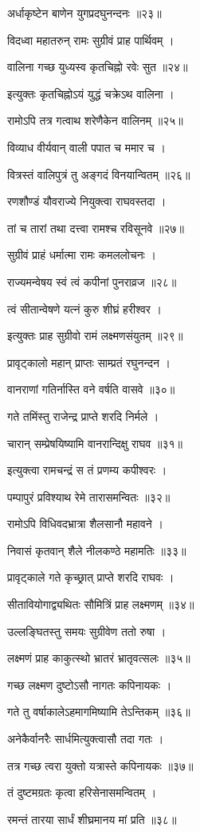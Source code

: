 अर्धाकृष्टेन बाणेन युगप्रदघुनन्दनः ॥२३॥

विदध्वा महातरुन् रामः सुग्रीवं प्राह पार्थिवम् ।

वालिना गच्छ युध्यस्व कृतचिह्नो रवेः सुत ॥२४॥

इत्युक्तः कृतचिह्नोऽयं युद्धं चक्रेऽथ वालिना ।

रामोऽपि तत्र गत्वाथ शरेणैकेन वालिनम् ॥२५॥

विव्याध वीर्यवान् वाली पपात च ममार च ।

वित्रस्तं वालिपुत्रं तु अङ्गदं विनयान्वितम् ॥२६॥

रणशौण्डं यौवराज्ये नियुक्त्वा राघवस्तदा ।

तां च तारां तथा दत्त्वा रामश्च रविसूनवे ॥२७॥

सुग्रीवं प्राहं धर्मात्मा रामः कमललोचनः ।

राज्यमन्वेषय स्वं त्वं कपीनां पुनराव्रज ॥२८॥

त्वं सीतान्वेषणे यत्नं कुरु शीघ्रं हरीश्वर ।

इत्युक्तः प्राह सुग्रीवो रामं लक्ष्मणसंयुतम् ॥२९॥

प्रावृट्कालो महान् प्राप्तः साम्प्रतं रघुनन्दन ।

वानराणां गतिर्नास्ति वने वर्षति वासवे ॥३०॥

गते तमिंस्तु राजेन्द्र प्राप्ते शरदि निर्मले ।

चारान् सम्प्रेषयिष्यामि वानरान्दिक्षु राघव ॥३१॥

इत्युक्त्वा रामचन्द्रं स तं प्रणम्य कपीश्वरः ।

पम्पापुरं प्रविश्याथ रेमे तारासमन्वितः ॥३२॥

रामोऽपि विधिवदभ्रात्रा शैलसानौ महावने ।

निवासं कृतवान् शैले नीलकण्ठे महामतिः ॥३३॥

प्रावृट्काले गते कृच्छ्रात् प्राप्ते शरदि राघवः ।

सीतावियोगाद्व्यथितः सौमित्रिं प्राह लक्ष्मणम् ॥३४॥

उल्लङ्घितस्तु समयः सुग्रीवेण ततो रुषा ।

लक्ष्मणं प्राह काकुत्स्थो भ्रातरं भ्रातृवत्सलः ॥३५॥

गच्छ लक्ष्मण दुष्टोऽसौ नागतः कपिनायकः ।

गते तु वर्षाकालेऽहमागमिष्यामि तेऽन्तिकम् ॥३६॥

अनेकैर्वानरैः सार्धमित्युक्त्वासौ तदा गतः ।

तत्र गच्छ त्वरा युक्तो यत्रास्ते कपिनायकः ॥३७॥

तं दुष्टमग्रतः कृत्वा हरिसेनासमन्वितम् ।

रमन्तं तारया सार्धं शीघ्रमानय मां प्रति ॥३८॥

